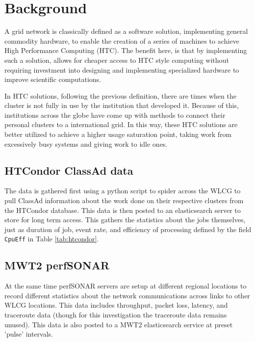 \documentclass[sigconf]{acmart}
\begin{document}
\section{Background}
A grid network is classically defined as a software solution, implementing general commodity hardware, to enable the creation of a series of machines to achieve High Performance Computing (HTC). The benefit here, is that by implementing such a solution, allows for cheaper access to HTC style computing without requiring investment into designing and implementing specialized hardware to improve scientific computations.

In HTC solutions, following the previous definition, there are times when the cluster is not fully in use by the institution that developed it. Because of this, institutions across the globe have come up with methods to connect their personal clusters to a international grid. In this way, these HTC solutions are better utilized to achieve a higher usage saturation point, taking work from excessively busy systems and giving work to idle ones.
\subsection{HTCondor ClassAd data}
The data is gathered first using a python script to spider across the WLCG to pull ClassAd information about the work done on their respective clusters from the HTCondor\cite{condor} database. This data is then posted to an elasticsearch server to store for long term access. This gathers the statistics about the jobs themselves, just as duration of job, event rate, and efficiency of processing defined by the field \texttt{CpuEff} in Table \ref{tab:htcondor}. 
\subsection{MWT2 perfSONAR}
At the same time perfSONAR servers are setup at different regional locations to record different statistics about the network communications across links to other WLCG locations. This data includes throughput, packet loss, latency, and traceroute data (though for this investigation the traceroute data remains unused). This data is also posted to a MWT2 elasticsearch service at preset 'pulse' intervals.
\end{document}
